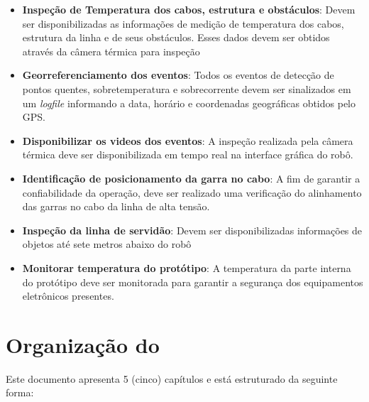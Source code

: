     \begin{itemize}
    	\item{\textbf{Inspeção de Temperatura dos cabos, estrutura e obstáculos}}: Devem ser disponibilizadas as informações de medição de temperatura dos cabos, estrutura da linha e de seus obstáculos. Esses dados devem ser obtidos através da câmera térmica para inspeção
    	\item{\textbf{Georreferenciamento dos eventos}}: Todos os eventos de detecção de pontos quentes, sobretemperatura e sobrecorrente devem ser sinalizados em um \textit{logfile} informando a data, horário e coordenadas geográficas obtidos pelo GPS.
    	\item{\textbf{Disponibilizar os videos dos eventos}}: A inspeção realizada pela câmera térmica deve ser disponibilizada em tempo real na interface gráfica do robô.
    	\item{\textbf{Identificação de posicionamento da garra no cabo}}: A fim de garantir a confiabilidade da operação, deve ser realizado uma verificação do alinhamento das garras no cabo da linha de alta tensão.
    	\item{\textbf{Inspeção da linha de servidão}}: Devem ser disponibilizadas informações de objetos até sete metros abaixo do robô
    	\item \textbf{Monitorar temperatura do protótipo}: A temperatura da parte interna do protótipo deve ser monitorada para garantir a segurança dos equipamentos eletrônicos presentes.
	\end{itemize}

\section{Organização do \thetypework}
\label{section:organizacao}

Este documento apresenta 5 (cinco) capítulos e está estruturado da seguinte forma:

